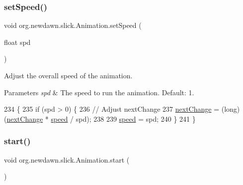 \subsubsection{\texorpdfstring{set\+Speed()}{setSpeed()}}
{\footnotesize\ttfamily void org.\+newdawn.\+slick.\+Animation.\+set\+Speed (\begin{DoxyParamCaption}\item[{float}]{spd }\end{DoxyParamCaption})\hspace{0.3cm}{\ttfamily [inline]}}

Adjust the overall speed of the animation.


\begin{DoxyParams}{Parameters}
{\em spd} & The speed to run the animation. Default\+: 1. \\
\hline
\end{DoxyParams}

\begin{DoxyCode}
234                                     \{
235         \textcolor{keywordflow}{if} (spd > 0) \{
236             \textcolor{comment}{// Adjust nextChange}
237             \mbox{\hyperlink{classorg_1_1newdawn_1_1slick_1_1_animation_a28280195bf1df3c929ca69b1c4d59443}{nextChange}} = (long) (\mbox{\hyperlink{classorg_1_1newdawn_1_1slick_1_1_animation_a28280195bf1df3c929ca69b1c4d59443}{nextChange}} * \mbox{\hyperlink{classorg_1_1newdawn_1_1slick_1_1_animation_a0ccda8ed8082763a52d2819e414dd5b9}{speed}} / spd);
238 
239             \mbox{\hyperlink{classorg_1_1newdawn_1_1slick_1_1_animation_a0ccda8ed8082763a52d2819e414dd5b9}{speed}} = spd;
240         \} 
241     \}
\end{DoxyCode}
\mbox{\label{classorg_1_1newdawn_1_1slick_1_1_animation_a115069b3b06f876db39d90a61ab8d525}} 
\subsubsection{\texorpdfstring{start()}{start()}}
{\footnotesize\ttfamily void org.\+newdawn.\+slick.\+Animation.\+start (\begin{DoxyParamCaption}{ }\end{DoxyParamCaption})\hspace{0.3cm}{\ttfamily [inline]}}


